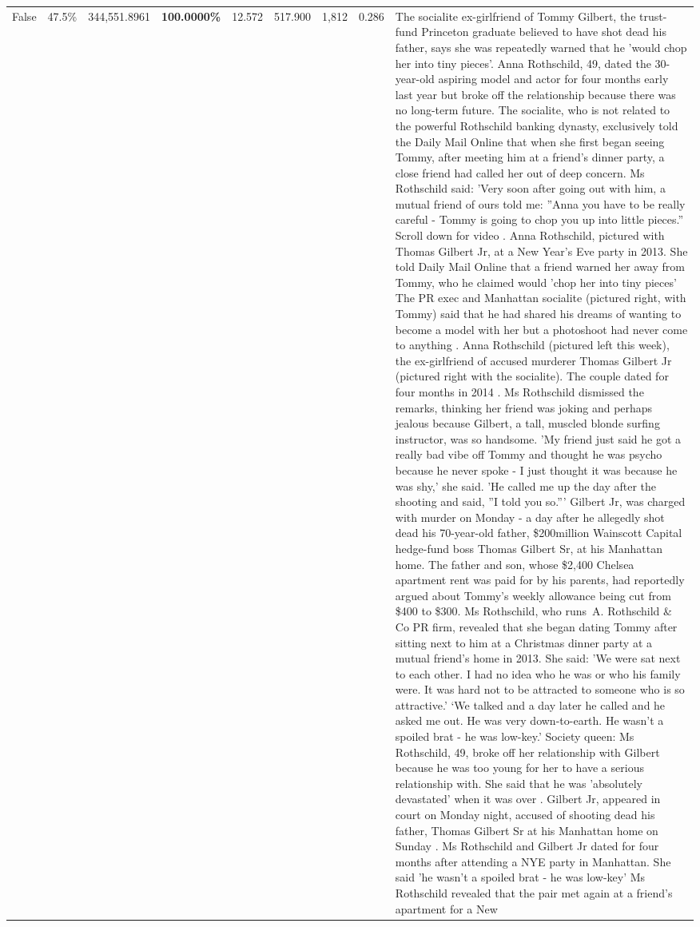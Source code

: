 \begin{table}[H]
\begin{tabular}{lllrlllll}
False & 47.5\% & 344,551.8961 & \bfseries \color{red} 100.0000\% & 12.572 & 517.900 & 1,812 & 0.286 & The socialite ex-girlfriend of Tommy Gilbert, the trust-fund Princeton graduate believed to have shot dead his father, says she was repeatedly warned that he 'would chop her into tiny pieces'. Anna Rothschild, 49, dated the 30-year-old aspiring model and actor for four months early last year but broke off the relationship because there was no long-term future. The socialite, who is not related to the powerful Rothschild banking dynasty, exclusively told the Daily Mail Online that when she first began seeing Tommy, after meeting him at a friend's dinner party, a close friend had called her out of deep concern. Ms Rothschild said: 'Very soon after going out with him, a mutual friend of ours told me: ''Anna you have to be really careful - Tommy is going to chop you up into little pieces.'' Scroll down for video . Anna Rothschild, pictured with Thomas Gilbert Jr, at a New Year's Eve party in 2013. She told Daily Mail Online that a friend warned her away from Tommy, who he claimed would 'chop her into tiny pieces' The PR exec and Manhattan socialite (pictured right, with Tommy) said that he had shared his dreams of wanting to become a model with her but a photoshoot had never come to anything . Anna Rothschild (pictured left this week), the ex-girlfriend of accused murderer Thomas Gilbert Jr (pictured right with the socialite). The couple dated for four months in 2014 . Ms Rothschild dismissed the remarks, thinking her friend was joking and perhaps jealous because Gilbert, a tall, muscled blonde surfing instructor, was so handsome. 'My friend just said he got a really bad vibe off Tommy and thought he was psycho because he never spoke - I just thought it was because he was shy,' she said. 'He called me up the day after the shooting and said, ''I told you so.''' Gilbert Jr, was charged with murder on Monday - a day after he allegedly shot dead his 70-year-old father, \$200million Wainscott Capital hedge-fund boss Thomas Gilbert Sr, at his Manhattan home. The father and son, whose \$2,400 Chelsea apartment rent was paid for by his parents, had reportedly argued about Tommy's weekly allowance being cut from \$400 to \$300. Ms Rothschild, who runs A. Rothschild \& Co PR firm, revealed that she began dating Tommy after sitting next to him at a Christmas dinner party at a mutual friend's home in 2013. She said: 'We were sat next to each other. I had no idea who he was or who his family were. It was hard not to be attracted to someone who is so attractive.' ‘We talked and a day later he called and he asked me out. He was very down-to-earth. He wasn’t a spoiled brat - he was low-key.’ Society queen: Ms Rothschild, 49, broke off her relationship with Gilbert because he was too young for her to have a serious relationship with. She said that he was 'absolutely devastated' when it was over . Gilbert Jr, appeared in court on Monday night, accused of shooting dead his father, Thomas Gilbert Sr at his Manhattan home on Sunday . Ms Rothschild and Gilbert Jr dated for four months after attending a NYE party in Manhattan. She said 'he wasn't a spoiled brat - he was low-key' Ms Rothschild revealed that the pair met again at a friend’s apartment for a New 
\end{tabular}
\end{table}
